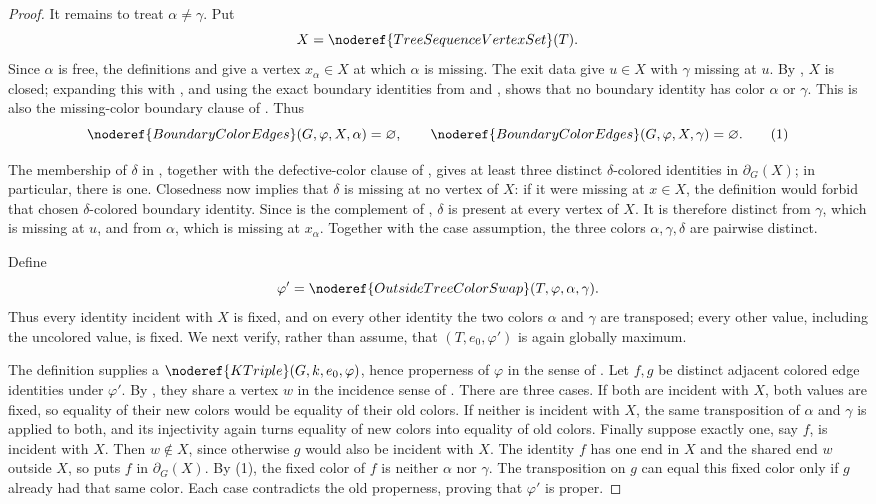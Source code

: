 \begin{proof}
It remains to treat $\alpha\ne\gamma$.  Put
\[
 X=\noderef{TreeSequenceVertexSet}(T).
\]
Since $\alpha$ is free, the definitions
 and  give a vertex
$x_\alpha\in X$ at which $\alpha$ is missing.  The exit data give
$u\in X$ with $\gamma$ missing at $u$.  By
, $X$ is closed; expanding this with
, and using the exact boundary identities
from  and , shows that
no boundary identity has color $\alpha$ or $\gamma$.  This is also the
missing-color boundary clause of
.  Thus
\[
 \noderef{BoundaryColorEdges}(G,\varphi,X,\alpha)=\varnothing,
 \qquad
 \noderef{BoundaryColorEdges}(G,\varphi,X,\gamma)=\varnothing. \tag{1}
\]

The membership of $\delta$ in , together with
the defective-color clause of
, gives at least three
distinct $\delta$-colored identities in $\partial_G(X)$; in particular,
there is one.  Closedness now implies that $\delta$ is missing at no
vertex of $X$: if it were missing at $x\in X$, the definition
 would forbid that chosen
$\delta$-colored boundary identity.  Since  is the
complement of , $\delta$ is present at every
vertex of $X$.  It is therefore distinct from $\gamma$, which is missing
at $u$, and from $\alpha$, which is missing at $x_\alpha$.  Together with
the case assumption, the three colors $\alpha,\gamma,\delta$ are
pairwise distinct.

Define
\[
 \varphi'=\noderef{OutsideTreeColorSwap}(T,\varphi,\alpha,\gamma).
\]
Thus every identity incident with $X$ is fixed, and on every other
identity the two colors $\alpha$ and $\gamma$ are transposed; every other
value, including the uncolored value, is fixed.  We next verify, rather
than assume, that $(T,e_0,\varphi')$ is again globally maximum.

The definition  supplies a
$\noderef{KTriple}(G,k,e_0,\varphi)$, hence properness of $\varphi$ in the
sense of .  Let $f,g$ be distinct adjacent
colored edge identities under $\varphi'$.  By
, they share a vertex $w$ in the incidence sense
of .  There are three cases.  If both are incident with
$X$, both values are fixed, so equality of their new colors would be
equality of their old colors.  If neither is incident with $X$, the same
transposition of $\alpha$ and $\gamma$ is applied to both, and its
injectivity again turns equality of new colors into equality of old
colors.  Finally suppose exactly one, say $f$, is incident with $X$.
Then $w\notin X$, since otherwise $g$ would also be incident with $X$.
The identity $f$ has one end in $X$ and the shared end $w$ outside $X$,
so  puts $f$ in $\partial_G(X)$.  By (1), the
fixed color of $f$ is neither $\alpha$ nor $\gamma$.  The transposition
on $g$ can equal this fixed color only if $g$ already had that same
color.  Each case contradicts the old properness, proving that
$\varphi'$ is proper.


\end{proof}
